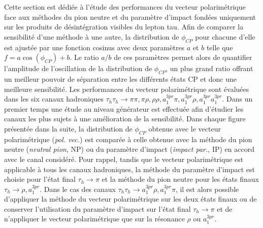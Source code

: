 Cette section est dédiée à l'étude des performances du vecteur polarimétrique face aux méthodes du pion neutre et du paramètre d'impact fondées uniquement sur les produits de désintégration visibles du lepton tau. Afin de comparer la sensibilité d'une méthode à une autre, la distribution de $\phi_{CP}$ pour chacune d'elle est ajustée par une fonction cosinus avec deux paramètres $a$ et $b$ telle que $f = a\cos(\phi_{CP})+b$. Le ratio $a/b$ de ces paramètres permet alors de quantifier l'amplitude de l'oscillation de la distribution de $\phi_{CP}$, un plus grand ratio offrant un meilleur pouvoir de séparation entre les différents états CP et donc une meilleure sensibilité. Les performances du vecteur polarimétrique sont évaluées dans les six canaux hadroniques $\tau_h\tau_h\rightarrow\pi\pi,\pi\rho,\rho\rho,a_1^{3pr}\pi,a_1^{3pr}\rho,a_1^{3pr}a_1^{3pr}$. Dans un premier temps une étude au niveau générateur est effectuée afin d'étudier les canaux les plus sujets à une amélioration de la sensibilité. Dans chaque figure présentée dans la suite, la distribution de $\phi_{CP}$ obtenue avec le vecteur polarimétrique (\textit{pol. vec.}) est comparée à celle obtenue avec la méthode du pion neutre (\textit{neutral pion}, NP) ou du paramètre d'impact (\textit{impact par.}, IP) en accord avec le canal considéré. Pour rappel, tandis que le vecteur polarimétrique est applicable à tous les canaux hadroniques, la méthode du paramètre d'impact est choisie pour l'état final $\tau_h\rightarrow\pi$ et la méthode du pion neutre pour les états finaux $\tau_h\rightarrow\rho,a_1^{3pr}$. Dans le cas des canaux $\tau_h\tau_h\rightarrow a_1^{3pr}\rho,a_1^{3pr}\pi$, il est alors possible d'appliquer la méthode du vecteur polarimétrique sur les deux états finaux ou de conserver l'utilisation du paramètre d'impact sur l'état final $\tau_h\rightarrow\pi$ et de n'appliquer le vecteur polarimétrique que sur la résonance $\rho$ ou $a_1^{3pr}$. \\

